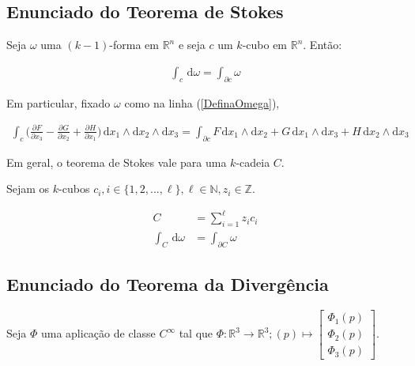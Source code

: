 \documentclass[12pt,a4paper]{article}
\begin{document}
	\subsection{Enunciado do Teorema de Stokes}
		\begin{flushright}
		\end{flushright}

		Seja $\omega$ uma $(k-1)$-forma em $\mathbb{R}^n$ e seja $c$ um $k$-cubo em $\mathbb{R}^n$. Ent\~ao:

		\begin{align}
			\int_c \,\mathrm{d}\omega = \int_{\partial c} \omega
		\end{align}

		Em particular, fixado $\omega$ como na linha (\ref{DefinaOmega}),

		\begin{align}
			\int_c \biggl( \frac{\partial F}{\partial x_3} - \frac{\partial G}{\partial x_2} + \frac{\partial H}{\partial x_1} \biggl) \,\mathrm{d}x_1 \wedge\mathrm{d}x_2 \wedge\mathrm{d}x_3 = \int_{\partial c} F \,\mathrm{d}x_1 \wedge \mathrm{d}x_2 + G \,\mathrm{d}x_1 \wedge \mathrm{d}x_3 + H \,\mathrm{d}x_2 \wedge \mathrm{d}x_3 \label{Quatorze}
		\end{align}

		Em geral, o teorema de Stokes vale para uma $k$-cadeia $C$.

		Sejam os $k$-cubos $c_i, i \in \{ 1, 2, ..., \ell \}, \ell \in \mathbb{N}, z_i \in \mathbb{Z}$.

		\begin{align}
			C &= \sum_{i = 1}^\ell z_i c_i \\
			\int_C \,\mathrm{d}\omega &= \int_{\partial C} \omega
		\end{align}

	\subsection{Enunciado do Teorema da Diverg\^encia}
		\begin{flushright}
		\end{flushright}

		Seja $\Phi$ uma aplica\c{c}\~ao de classe $C^\infty$ tal que $\Phi : \mathbb{R}^3 \rightarrow \mathbb{R}^3 ; (p) \mapsto \begin{bmatrix} \Phi_1(p) \\ \Phi_2(p) \\ \Phi_3(p) \end{bmatrix}$.
\end{document}
